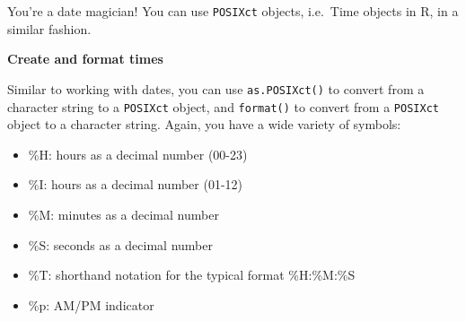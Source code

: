 \documentclass[]{article}
\providecommand{\tightlist}{%
  \setlength{\itemsep}{0pt}\setlength{\parskip}{0pt}}
\newcommand{\hlnum}[1]{\textcolor[rgb]{0.816,0.125,0.439}{#1}}%
\newcommand{\hlstr}[1]{\textcolor[rgb]{0.251,0.627,0.251}{#1}}%
\newcommand{\hlcom}[1]{\textcolor[rgb]{0.502,0.502,0.502}{\textit{#1}}}%
\newcommand{\hlstd}[1]{\textcolor[rgb]{0.251,0.251,0.251}{#1}}%
\newcommand{\hlkwc}[1]{\textcolor[rgb]{0.251,0.251,0.251}{#1}}%
\newcommand{\hlkwd}[1]{\textcolor[rgb]{0.878,0.439,0.125}{#1}}%
\newenvironment{Shaded}{\begin{myshaded}}{\end{myshaded}}
\newcommand{\KeywordTok}[1]{\hlkwd{#1}}
\newcommand{\DataTypeTok}[1]{\hlkwc{#1}}
\newcommand{\DecValTok}[1]{\hlnum{#1}}
\newcommand{\StringTok}[1]{\hlstr{#1}}
\newcommand{\CommentTok}[1]{\hlcom{#1}}
\newcommand{\NormalTok}[1]{\hlstd{#1}}
\begin{document}
\begin{Shaded}
\end{Shaded}

You're a date magician! You can use \texttt{POSIXct} objects, i.e.~Time
objects in R, in a similar fashion.

\textbf{Create and format times}

Similar to working with dates, you can use \texttt{as.POSIXct()} to
convert from a character string to a \texttt{POSIXct} object, and
\texttt{format()} to convert from a \texttt{POSIXct} object to a
character string. Again, you have a wide variety of symbols:

\begin{itemize}
\tightlist
\item
  \%H: hours as a decimal number (00-23)
\item
  \%I: hours as a decimal number (01-12)
\item
  \%M: minutes as a decimal number
\item
  \%S: seconds as a decimal number
\item
  \%T: shorthand notation for the typical format \%H:\%M:\%S
\item
  \%p: AM/PM indicator
\end{itemize}
\end{document}
